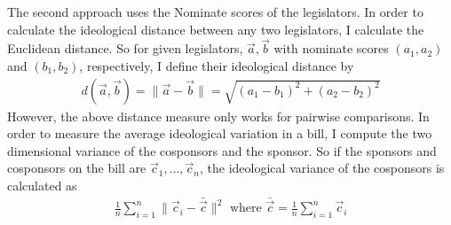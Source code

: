 \documentclass{article}
\begin{document}
The second approach uses the Nominate scores of the legislators. In order to calculate the ideological distance between any two legislators, I calculate the Euclidean distance. So for given legislators, $\vec{a}, \vec{b}$ with nominate scores $(a_1, a_2)$ and $(b_1, b_2)$, respectively, I define their ideological distance by
\begin{align*}
    d(\vec{a}, \vec{b}) = \|\vec{a} - \vec{b}\| = \sqrt{(a_1 - b_1)^2 + (a_2 - b_2)^2}
\end{align*}
However, the above distance measure only works for pairwise comparisons. In order to measure the average ideological variation in a bill, I compute the two dimensional variance of the cosponsors and the sponsor. So if the sponsors and cosponsors on the bill are $\vec{c}_1, \dots, \vec{c}_n$, the ideological variance of the cosponsors is calculated as
\begin{align*}
    \frac{1}{n} \sum_{i = 1}^n \|\vec{c}_i - \bar{\vec{c}}\|^2 \text{ where } \bar{\vec{c}} = \frac{1}{n} \sum_{i = 1}^n \vec{c}_i
\end{align*}
\end{document}
